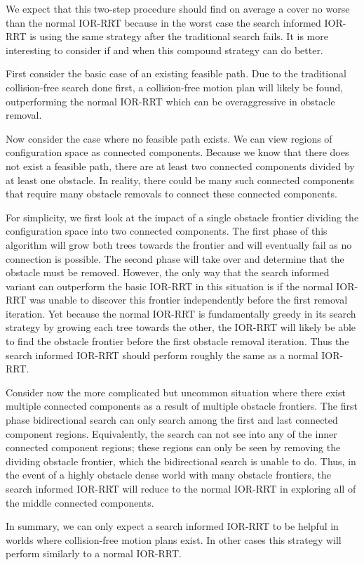 We expect that this two-step procedure should find on average a cover no worse than the normal IOR-RRT because in the worst case the search informed IOR-RRT is using the same strategy after the traditional search fails. It is more interesting to consider if and when this compound strategy can do better. 

First consider the basic case of an existing feasible path. Due to the traditional collision-free search done first, a collision-free motion plan will likely be found, outperforming the normal IOR-RRT which can be overaggressive in obstacle removal. 

Now consider the case where no feasible path exists. We can view regions of configuration space as connected components. Because we know that there does not exist a feasible path, there are at least two connected components divided by at least one obstacle. In reality, there could be many such connected components that require many obstacle removals to connect these connected components. 

For simplicity, we first look at the impact of a single obstacle frontier dividing the configuration space into two connected components. The first phase of this algorithm will grow both trees towards the frontier and will eventually fail as no connection is possible. The second phase will take over and determine that the obstacle must be removed. However, the only way that the search informed variant can outperform the basic IOR-RRT in this situation is if the normal IOR-RRT was unable to discover this frontier independently before the first removal iteration. Yet because the normal IOR-RRT is fundamentally greedy in its search strategy by growing each tree towards the other, the IOR-RRT will likely be able to find the obstacle frontier before the first obstacle removal iteration. Thus the search informed IOR-RRT should perform roughly the same as a normal IOR-RRT.

Consider now the more complicated but uncommon situation where there exist multiple connected components as a result of multiple obstacle frontiers. The first phase bidirectional search can only search among the first and last connected component regions. Equivalently, the search can not see into any of the inner connected component regions; these regions can only be seen by removing the dividing obstacle frontier, which the bidirectional search is unable to do. Thus, in the event of a highly obstacle dense world with many obstacle frontiers, the search informed IOR-RRT will reduce to the normal IOR-RRT in exploring all of the middle connected components. 

In summary, we can only expect a search informed IOR-RRT to be helpful in worlds where collision-free motion plans exist. In other cases this strategy will perform similarly to a normal IOR-RRT.
